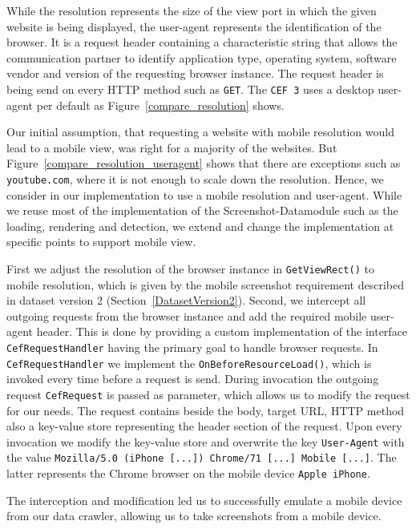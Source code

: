 While the resolution represents the size of the view port in which the given website is being displayed, the user-agent represents the identification of the browser. It is a request header containing a characteristic string that allows the communication partner to identify application type, operating system, software vendor and version of the requesting browser instance. The request header is being send on every HTTP method such as \texttt{GET}. The \texttt{CEF 3} uses a desktop user-agent per default as Figure~\ref{compare_resolution} shows.

Our initial assumption, that requesting a website with mobile resolution would lead to a mobile view, was right for a majority of the websites. But Figure~\ref{compare_resolution_useragent} shows that there are exceptions such as \texttt{youtube.com}, where it is not enough to scale down the resolution. Hence, we consider in our implementation to use a mobile resolution and user-agent. While we reuse most of the implementation of the Screenshot-Datamodule such as the loading, rendering and detection, we extend and change the implementation at specific points to support mobile view.

First we adjust the resolution of the browser instance in \texttt{GetViewRect()} to mobile resolution, which is given by the mobile screenshot requirement described in dataset version 2 (Section~\ref{DatasetVersion2}). Second, we intercept all outgoing requests from the browser instance and add the required mobile user-agent header. This is done by providing a custom implementation of the interface \texttt{CefRequestHandler} having the primary goal to handle browser requests. In \texttt{CefRequestHandler} we implement the \texttt{OnBeforeResourceLoad()}, which is invoked every time before a request is send. During invocation the outgoing request \texttt{CefRequest} is passed as parameter, which allows us to modify the request for our needs. The request contains beside the body, target URL, HTTP method also a key-value store representing the header section of the request. Upon every invocation we modify the key-value store and overwrite the key \texttt{User-Agent} with the value \texttt{Mozilla/5.0 (iPhone [...]) Chrome/71 [...] Mobile [...]}. The latter represents the Chrome browser on the mobile device \texttt{Apple iPhone}. 

The interception and modification led us to successfully emulate a mobile device from our data crawler, allowing us to take screenshots from a mobile device.

